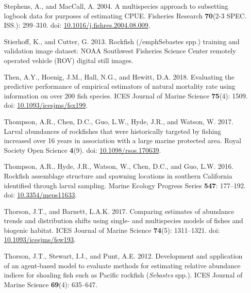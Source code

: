 \documentclass[
  english,
  a4paper,
]{article}
\newlength{\cslhangindent}
\newlength{\cslentryspacingunit} %
\newenvironment{CSLReferences}[2] %
 {%
  \setlength{\parindent}{0pt}
  \ifodd #1
  \let\oldpar\par
  \def\par{\hangindent=\cslhangindent\oldpar}
  \fi
  \setlength{\parskip}{#2\cslentryspacingunit}
 }%
 {}
\begin{document}
\begin{CSLReferences}{1}{0}
\leavevmode{}%
Stephens, A., and MacCall, A. 2004. {A multispecies approach to subsetting logbook data for purposes of estimating CPUE}. Fisheries Research \textbf{70}(2-3 SPEC. ISS.): 299--310. doi: \href{https://doi.org/10.1016/j.fishres.2004.08.009}{10.1016/j.fishres.2004.08.009}.

\leavevmode{}%
Stierhoff, K., and Cutter, G. 2013. {Rockfish (/emph{Sebastes spp.}) training and validation image dataset: NOAA Southwest Fisheries Science Center remotely operated vehicle (ROV) digital still images.}

\leavevmode{}%
Then, A.Y., Hoenig, J.M., Hall, N.G., and Hewitt, D.A. 2018. {Evaluating the predictive performance of empirical estimators of natural mortality rate using information on over 200 fish species}. ICES Journal of Marine Science \textbf{75}(4): 1509. doi: \href{https://doi.org/10.1093/icesjms/fsx199}{10.1093/icesjms/fsx199}.

\leavevmode{}%
Thompson, A.R., Chen, D.C., Guo, L.W., Hyde, J.R., and Watson, W. 2017. {Larval abundances of rockfishes that were historically targeted by fishing increased over 16 years in association with a large marine protected area}. Royal Society Open Science \textbf{4}(9). doi: \href{https://doi.org/10.1098/rsos.170639}{10.1098/rsos.170639}.

\leavevmode{}%
Thompson, A.R., Hyde, J.R., Watson, W., Chen, D.C., and Guo, L.W. 2016. {Rockfish assemblage structure and spawning locations in southern California identified through larval sampling}. Marine Ecology Progress Series \textbf{547}: 177--192. doi: \href{https://doi.org/10.3354/meps11633}{10.3354/meps11633}.

\leavevmode{}%
Thorson, J.T., and Barnett, L.A.K. 2017. {Comparing estimates of abundance trends and distribution shifts using single- and multispecies models of fishes and biogenic habitat}. ICES Journal of Marine Science \textbf{74}(5): 1311--1321. doi: \href{https://doi.org/10.1093/icesjms/fsw193}{10.1093/icesjms/fsw193}.

\leavevmode{}%
Thorson, J.T., Stewart, I.J., and Punt, A.E. 2012. {Development and application of an agent-based model to evaluate methods for estimating relative abundance indices for shoaling fish such as Pacific rockfish (\emph{Sebastes} spp.)}. ICES Journal of Marine Science \textbf{69}(4): 635--647.


\end{CSLReferences}
\end{document}
